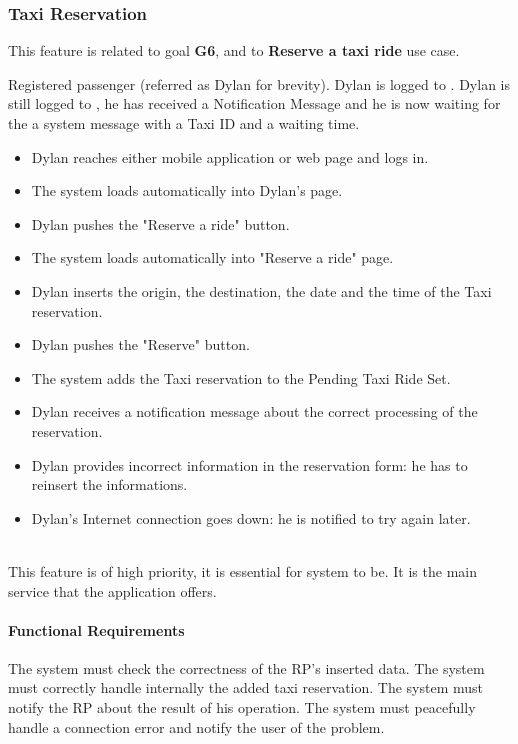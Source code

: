 \subsubsection{Taxi Reservation}
This feature is related to goal \textbf{G6}, and to \textbf{Reserve a taxi ride} use case.
\begin{itemize}
	 Registered passenger (referred as Dylan for brevity).
	 Dylan is logged to \myTaxiService{}.
	 Dylan is still logged to \myTaxiService{}, he has received a Notification Message and he is now waiting for the a system message with a Taxi ID and a waiting time.
	\begin{itemize}
		\item Dylan reaches either \myTaxiService{} mobile application or web page and logs in.
		\item The system loads automatically into Dylan's page.
		\item Dylan pushes the "Reserve a ride" button.
		\item The system loads automatically into "Reserve a ride" page.
		\item Dylan inserts the origin, the destination, the date and the time of the Taxi reservation.
		\item Dylan pushes the "Reserve" button.
		\item The system adds the Taxi reservation to the Pending Taxi Ride Set.
		\item Dylan receives a notification message about the correct processing of the reservation. 
	\end{itemize}
	\begin{itemize}
		\item Dylan provides incorrect information in the reservation form: he has to reinsert the informations.
		\item Dylan's Internet connection goes down: he is notified to try again later.  
	\end{itemize}
\end{itemize}
\\
This feature is of high priority, it is essential for \myTaxiService{} system to be. It is the main service that the application offers.
\paragraph{Functional Requirements}
\begin{itemize}
	 The system must check the correctness of the RP's inserted data.
	 The system must correctly handle internally the added taxi reservation.
	 The system must notify the RP about the result of his operation.
	 The system must peacefully handle a connection error and notify the user of the problem.
\end{itemize}
